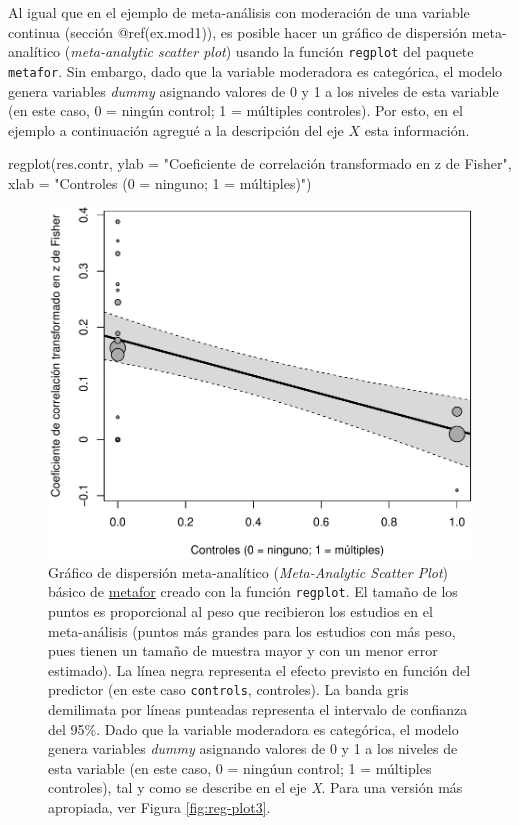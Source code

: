 \documentclass[
  bookmarksnumbered]{article}
\newenvironment{Shaded}{\begin{snugshade}}{\end{snugshade}}
\newcommand{\AttributeTok}[1]{\textcolor[rgb]{0.00,0.34,0.68}{#1}}
\newcommand{\FunctionTok}[1]{\textcolor[rgb]{0.39,0.29,0.61}{#1}}
\newcommand{\NormalTok}[1]{\textcolor[rgb]{0.12,0.11,0.11}{#1}}
\newcommand{\StringTok}[1]{\textcolor[rgb]{0.75,0.01,0.01}{#1}}
\begin{document}
Al igual que en el ejemplo de meta-análisis con moderación de una variable continua (sección @ref(ex.mod1)), es posible hacer un gráfico de dispersión meta-analítico (\emph{meta-analytic scatter plot}) usando la función \texttt{regplot} del paquete \texttt{metafor}. Sin embargo, dado que la variable moderadora es categórica, el modelo genera variables \emph{dummy} asignando valores de 0 y 1 a los niveles de esta variable (en este caso, 0 = ningún control; 1 = múltiples controles). Por esto, en el ejemplo a continuación agregué a la descripción del eje \(X\) esta información.

\begin{Shaded}
\begin{Highlighting}[]
\FunctionTok{regplot}\NormalTok{(res.contr,}
        \AttributeTok{ylab =} \StringTok{"Coeficiente de correlación transformado en z de Fisher"}\NormalTok{,}
        \AttributeTok{xlab =} \StringTok{"Controles (0 = ninguno; 1 = múltiples)"}\NormalTok{)}
\end{Highlighting}
\end{Shaded}

\begin{figure}
\centering
\includegraphics{Meta-analysis_files/figure-latex/reg-plot2-1.pdf}
\caption{\label{fig:reg-plot2}Gráfico de dispersión meta-analítico (\emph{Meta-Analytic Scatter Plot}) básico de \href{https://www.metafor-project.org/doku.php}{metafor} creado con la función \texttt{regplot}. El tamaño de los puntos es proporcional al peso que recibieron los estudios en el meta-análisis (puntos más grandes para los estudios con más peso, pues tienen un tamaño de muestra mayor y con un menor error estimado). La línea negra representa el efecto previsto en función del predictor (en este caso \texttt{controls}, controles). La banda gris demilimata por líneas punteadas representa el intervalo de confianza del 95\%. Dado que la variable moderadora es categórica, el modelo genera variables \emph{dummy} asignando valores de 0 y 1 a los niveles de esta variable (en este caso, 0 = ningúun control; 1 = múltiples controles), tal y como se describe en el eje \emph{X}. Para una versión más apropiada, ver Figura \ref{fig:reg-plot3}.}
\end{figure}
\end{document}
